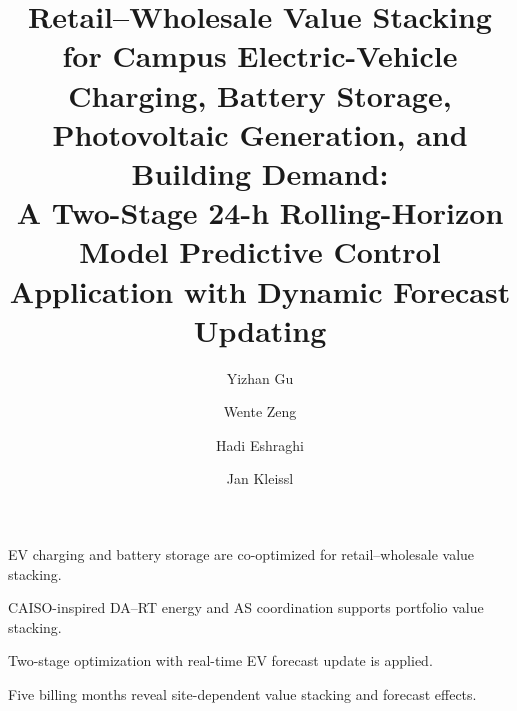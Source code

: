 \documentclass[final,5p,times]{elsarticle}
\begin{document}
\begin{frontmatter}

\title{Retail--Wholesale Value Stacking for Campus Electric-Vehicle Charging, Battery Storage, Photovoltaic Generation, and Building Demand: \\
A Two-Stage 24-h Rolling-Horizon Model Predictive Control Application with Dynamic Forecast Updating}

\author[ucsd]{Yizhan Gu}
\author[totalenergies]{Wente Zeng}
\author[totalenergies]{Hadi Eshraghi}
\author[ucsd]{Jan Kleissl}


\begin{highlights}
\item EV charging and battery storage are co-optimized for retail--wholesale value stacking.
\item CAISO-inspired DA--RT energy and AS coordination supports portfolio value stacking.
\item Two-stage optimization with real-time  EV forecast update is applied.
\item Five billing months reveal site-dependent value stacking and forecast effects.
\end{highlights}


\end{frontmatter}
\end{document}
